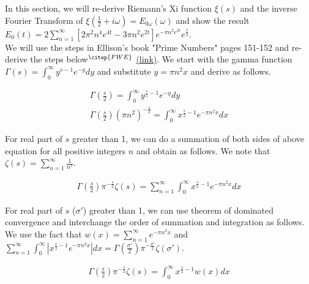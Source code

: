 \documentclass[11pt]{elsarticle}
\begin{document}
In this section, we will re-derive Riemann's Xi function $\xi(s)$ and the inverse Fourier Transform of  $\xi(\frac{1}{2} + i \omega)= E_{0\omega}(\omega)$ and show the result $E_{0}(t) =   2 \sum_{n=1}^{\infty}  [ 2 \pi^{2} n^{4} e^{4t}    - 3 \pi n^{2}   e^{2t} ]  e^{- \pi n^{2} e^{2t}} e^{\frac{t}{2}} $. \\
 
We will use the steps in Ellison's book "Prime Numbers" pages 151-152 and re-derive the steps below$^{\citep{FWE}}$ \href{https://www.ocf.berkeley.edu/~araman/files/math_z/Ellison_p147-152.pdf#page=5}{(link)}. We start with the gamma function $\Gamma(s) = \int_{0}^{\infty} y^{s-1} e^{-y} dy$ and substitute $y = \pi n^{2} x$ and derive as follows. %

\begin{eqnarray*}\label{sec:App_H_eq_1}   
\Gamma(\frac{s}{2}) = \int_{0}^{\infty} y^{\frac{s}{2}-1} e^{-y} dy \\
\Gamma(\frac{s}{2})  (\pi n^{2})^{-\frac{s}{2}} = \int_{0}^{\infty} x^{\frac{s}{2}-1} e^{-\pi n^{2} x} dx
\end{eqnarray*}
\begin{equation} \end{equation}
 
For real part of $s$ greater than 1, we can do a  summation of both sides of above equation for all positive integers $n$ and obtain
as follows. We note that $\zeta(s)= \sum_{n=1}^{\infty} \frac{1}{n^{s}} $. 
 
\begin{eqnarray*}\label{sec:App_H_eq_2}   
\Gamma(\frac{s}{2}) \pi^{-\frac{s}{2}} \zeta(s) = \sum_{n=1}^{\infty} \int_{0}^{\infty} x^{\frac{s}{2}-1} e^{-\pi n^{2} x} dx
\end{eqnarray*}
\begin{equation} \end{equation}
 
For real part of $s$ ($\sigma'$) greater than 1, we can use theorem of dominated convergence and interchange the order of summation and integration as follows.  We use the fact that  $w(x) =  \displaystyle\sum\limits_{n=1}^{\infty} e^{- \pi n^{2}x }$ and \\
$ \displaystyle\sum_{n=1}^{\infty} \int_{0}^{\infty}| x^{\frac{s}{2}-1} e^{-\pi n^{2} x} | dx = \Gamma(\frac{\sigma'}{2}) \pi^{-\frac{\sigma'}{2}} \zeta(\sigma')$.

 \begin{eqnarray*} \label{sec:App_H_eq_3}   
\Gamma(\frac{s}{2}) \pi^{-\frac{s}{2}} \zeta(s) = \int_{0}^{\infty} x^{\frac{s}{2}-1} w(x)  dx
\end{eqnarray*}
\begin{equation} \end{equation}
\end{document}
